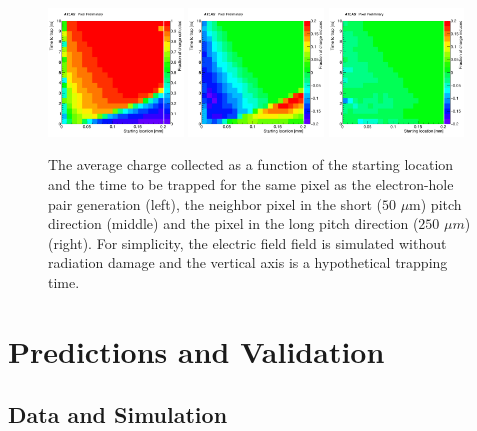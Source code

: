 \begin{figure}[!htpb]
\centering
\includegraphics[width=0.32\textwidth]{newtestramo_corrected_other.pdf}
\includegraphics[width=0.32\textwidth]{newtestramo_induced_0_1.pdf}
\includegraphics[width=0.32\textwidth]{newtestramo_induced_1_0.pdf}
\caption{The average charge collected as a function of the starting location and the time to be trapped for the same pixel as the electron-hole pair generation (left), the neighbor pixel in the short ($50$ $\mu $m) pitch direction (middle) and the pixel in the long pitch direction ($250$ $\mu m$) (right).  For simplicity, the electric field field is simulated without radiation damage and the vertical axis is a hypothetical trapping time.}
\label{fig:ramo:check}
\end{figure}



\section{Predictions and Validation}
\label{sec:digivalidation}


\subsection{Data and Simulation}

